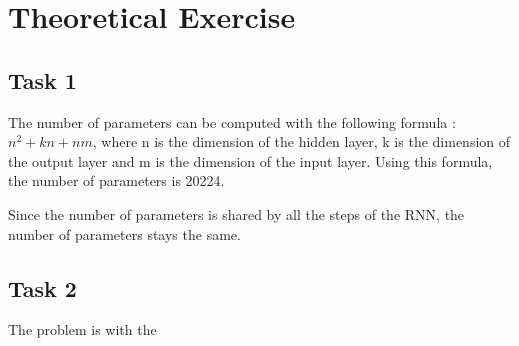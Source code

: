 \documentclass[10pt]{article}
\begin{document}
\section{Theoretical Exercise}
\subsection{Task 1}
The number of parameters can be computed with the following formula : 
$n^2+kn+nm$, where n is the dimension of the hidden layer, k is the dimension of the output layer and m is the dimension of the input layer. Using this formula, the number of parameters is 20224. 

Since the number of parameters is shared by all the steps of the RNN, the number of parameters stays the same.

\subsection{Task 2}
The problem is with the
\end{document}
